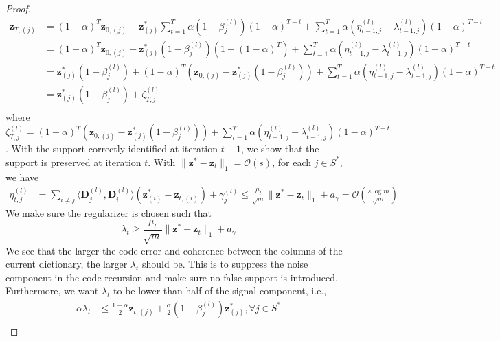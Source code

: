 \documentclass[10pt]{article} %
\newcommand{\D}{{\bm D}}
\newcommand{\z}{{\bm z}}
\begin{document}
\begin{proof}
\begin{equation}\label{eq:code_T}
\begin{aligned}
\z_{T, (j)} &=  (1 - \alpha)^T \z_{0, (j)} + \z^{\ast}_{(j)}  \sum_{t=1}^T \alpha(1 - \beta_j^{(l)})(1 - \alpha)^{T - t}   + \sum_{t=1}^T \alpha (\eta_{t-1,j}^{(l)} - \lambda_{t-1,j}^{(l)}) (1 - \alpha)^{T-t}\\
&= (1 - \alpha)^T \z_{0, (j)} + \z^{\ast}_{(j)} (1 - \beta_j^{(l)})(1 - (1 - \alpha)^T)  + \sum_{t=1}^T \alpha  (\eta_{t-1,j}^{(l)} - \lambda_{t-1,j}^{(l)}) (1 - \alpha)^{T-t}\\
&=  \z^{\ast}_{(j)} (1 - \beta_j^{(l)}) + (1 - \alpha)^T (\z_{0, (j)} - \z^{\ast}_{(j)} (1 - \beta_j^{(l)}))  + \sum_{t=1}^T \alpha  (\eta_{t-1,j}^{(l)} - \lambda_{t-1,j}^{(l)}) (1 - \alpha)^{T-t}\\
&= \z^{\ast}_{(j)} (1 - \beta_j^{(l)}) + \zeta_{T,j}^{(l)}\\
\end{aligned}
\end{equation}
where $\zeta _{T,j}^{(l)}= (1 - \alpha)^T (\z_{0, (j)} - \z^{\ast}_{(j)} (1 - \beta_j^{(l)}))  + \sum_{t=1}^T \alpha  (\eta_{t-1,j}^{(l)} - \lambda_{t-1,j}^{(l)}) (1 - \alpha)^{T-t}$. With the support correctly identified at iteration $t-1$, we show that the support is preserved at iteration $t$. With $\| \z^{\ast} - \z_t \|_1 = \mathcal{O}(s)$, for each $j \in S^{\ast}$, we have
%
\begin{equation}
\begin{aligned}
\eta_{t,j}^{(l)} &= \sum_{i \neq j} \langle \D_j^{(l)}, \D_i^{(l)} \rangle (\z^{\ast}_{(i)} - \z_{t, (i)}) + \gamma_j^{(l)} 
\leq \frac{\mu_l}{\sqrt{m}} \| \z^{\ast} - \z_t \|_1 + a_{\gamma} = \mathcal{O}(\frac{s\log{m} }{\sqrt{m}})
\end{aligned}
\end{equation}
%
We make sure the regularizer is chosen such that
%
\begin{equation}
\lambda_t \geq \frac{\mu_l}{\sqrt{m}} \| \z^{\ast} - \z_t \|_1 + a_{\gamma}
\end{equation}
%
We see that the larger the code error and coherence between the columns of the current dictionary, the larger $\lambda_t$ should be. This is to suppress the noise component in the code recursion and make sure no false support is introduced. Furthermore, we want $\lambda_t$ to be lower than half of the signal component, i.e.,
%
\begin{equation}
\begin{aligned}
\alpha \lambda_t &\leq \frac{1 - \alpha}{2} \z_{t, (j)} + \frac{\alpha}{2} (1 - \beta_j^{(l)}) \z^{\ast}_{(j)}, \forall j \in S^{\ast}\\

\end{aligned}
\end{equation}
\end{proof}
\end{document}
